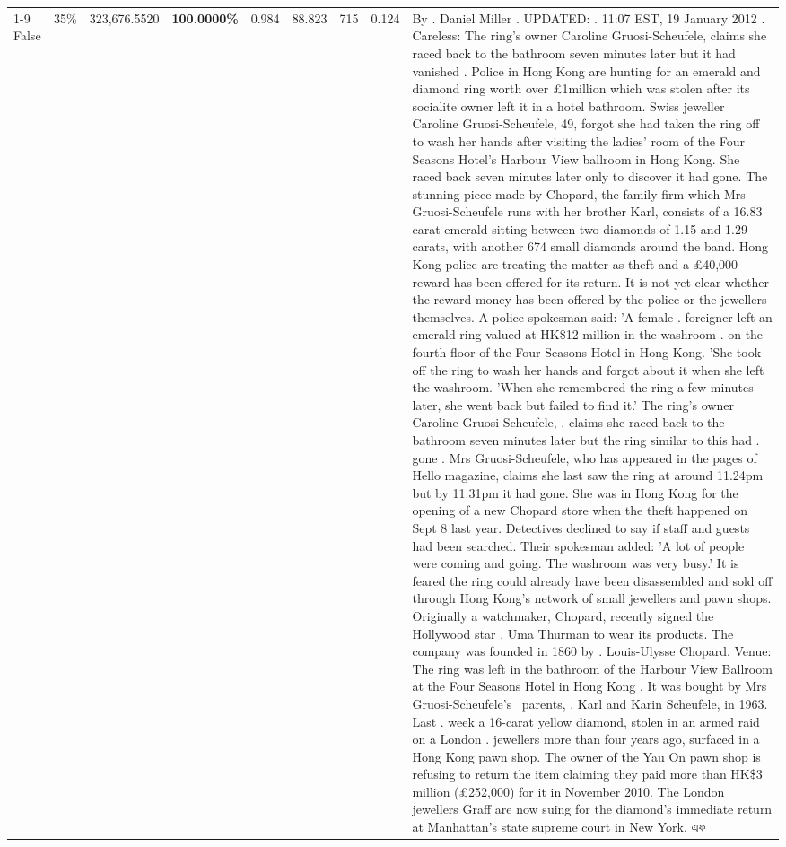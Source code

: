 \begin{table}[H]
\begin{tabular}{lllrlllll}
\cline{1-9} \cline{2-9}
False & 35\% & 323,676.5520 & \bfseries \color{red} 100.0000\% & 0.984 & 88.823 & 715 & 0.124 & By . Daniel Miller . UPDATED: . 11:07 EST, 19 January 2012 . Careless: The ring's owner Caroline Gruosi-Scheufele, claims she raced back to the bathroom seven minutes later but it had vanished . Police in Hong Kong are hunting for an emerald and diamond ring worth over £1million which was stolen after its socialite owner left it in a hotel bathroom. Swiss jeweller Caroline Gruosi-Scheufele, 49, forgot she had taken the ring off to wash her hands after visiting the ladies' room of the Four Seasons Hotel's Harbour View ballroom in Hong Kong. She raced back seven minutes later only to discover it had gone. The stunning piece made by Chopard, the family firm which Mrs Gruosi-Scheufele runs with her brother Karl, consists of a 16.83 carat emerald sitting between two diamonds of 1.15 and 1.29 carats, with another 674 small diamonds around the band. Hong Kong police are treating the matter as theft and a £40,000 reward has been offered for its return. It is not yet clear whether the reward money has been offered by the police or the jewellers themselves. A police spokesman said: 'A female . foreigner left an emerald ring valued at HK\$12 million in the washroom . on the fourth floor of the Four Seasons Hotel in Hong Kong. 'She took off the ring to wash her hands and forgot about it when she left the washroom. 'When she remembered the ring a few minutes later, she went back but failed to find it.' The ring's owner Caroline Gruosi-Scheufele, . claims she raced back to the bathroom seven minutes later but the ring similar to this had . gone . Mrs Gruosi-Scheufele, who has appeared in the pages of Hello magazine, claims she last saw the ring at around 11.24pm but by 11.31pm it had gone. She was in Hong Kong for the opening of a new Chopard store when the theft happened on Sept 8 last year. Detectives declined to say if staff and guests had been searched. Their spokesman added: 'A lot of people were coming and going. The washroom was very busy.' It is feared the ring could already have been disassembled and sold off through Hong Kong's network of small jewellers and pawn shops. Originally a watchmaker, Chopard, recently signed the Hollywood star . Uma Thurman to wear its products. The company was founded in 1860 by . Louis-Ulysse Chopard. Venue: The ring was left in the bathroom of the Harbour View Ballroom at the Four Seasons Hotel in Hong Kong . It was bought by Mrs Gruosi-Scheufele's  parents, . Karl and Karin Scheufele, in 1963. Last . week a 16-carat yellow diamond, stolen in an armed raid on a London . jewellers more than four years ago, surfaced in a Hong Kong pawn shop. The owner of the Yau On pawn shop is refusing to return the item claiming they paid more than HK\$3 million (£252,000) for it in November 2010. The London jewellers Graff are now suing for the diamond’s immediate return at Manhattan’s state supreme court in New York. এফ \\

\end{tabular}
\end{table}
